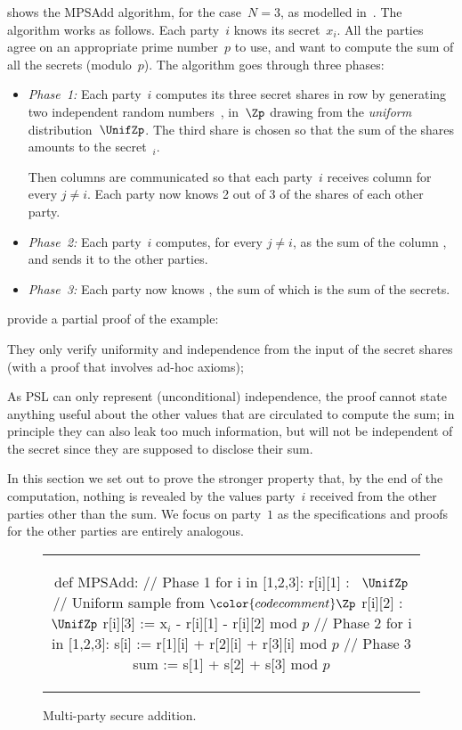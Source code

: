 \documentclass[acmsmall,nonacm,screen,appendix]{acmart}
\begin{document}
 shows the MPSAdd algorithm, for the case~$N=3$,
as modelled in~\cite{barthe2019probabilistic}.
The algorithm works as follows.
Each party~$i$ knows its secret~$x_i$.
All the parties agree on an appropriate prime number~$p$ to use,
and want to compute the sum of all the secrets (modulo~$p$).
The algorithm goes through three phases:
\begin{itemize}
  \item\emph{Phase~1:}
    Each party~$i$ computes its three secret shares in row 
    by generating two independent random
    numbers~,  in~$\Zp$
    drawing from the \emph{uniform} distribution~$\UnifZp$.
The third share  is chosen so that the sum of the shares
    amounts to the secret~$_i$.

    Then columns are communicated so that each party~$i$
    receives column  for every $j\ne i$.
    Each party now knows 2 out of 3 of the shares of each other party.
  \item\emph{Phase~2:}
    Each party~$i$
    computes, for every $j\ne i$,
     as the sum of the column ,
    and sends it to the other parties.
  \item\emph{Phase~3:}
    Each party now knows ,
    the sum of which is the sum of the secrets.
\end{itemize}

\citet{barthe2019probabilistic} provide a partial proof of the example:
\begin{enumerate*}
\item
  They only verify uniformity and independence from the input of the
  secret shares  (with a proof that involves ad-hoc axioms);
\item
  As PSL can only represent (unconditional) independence,
  the proof cannot state anything
  useful about the other values  that are circulated to compute the sum;
  in principle they can also leak too much information,
  but will not be independent of the secret since they are supposed to
  disclose their sum.
\end{enumerate*}

In this section we set out to prove the stronger property that,
by the end of the computation, nothing is revealed by the values
party~$i$ received from the other parties other than the sum.
We focus on party~$1$ as the specifications and proofs for the other parties
are entirely analogous.

\begin{figure}
  \centering \begin{tabular}{c}
  \begin{sourcecode}[gobble=2]
  def MPSAdd:
    // Phase 1
    for i in [1,2,3]:
      r[i][1] :~ $\UnifZp$ // Uniform sample from $\color{codecomment}\Zp$
      r[i][2] :~ $\UnifZp$
      r[i][3] := x$_i$ - r[i][1] - r[i][2] mod $p$
    // Phase 2
    for i in [1,2,3]:
      s[i] := r[1][i] + r[2][i] + r[3][i] mod $p$
    // Phase 3
    sum := s[1] + s[2] + s[3] mod $p$
  \end{sourcecode}\end{tabular}
  \caption{Multi-party secure addition.}
  \label{fig:mpsadd}
\end{figure}
\end{document}
